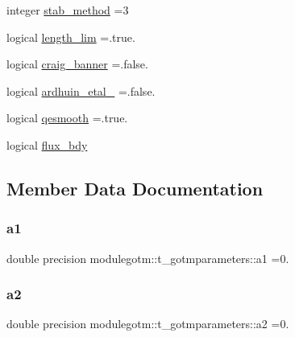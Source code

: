 \begin{DoxyCompactItemize}
integer \mbox{\hyperlink{structmodulegotm_1_1t__gotmparameters_a9f1e855319ebed889b5955d76280eeed}{stab\+\_\+method}} =3
\item 
logical \mbox{\hyperlink{structmodulegotm_1_1t__gotmparameters_a0593cb753559f5ac00d31b5189fb85f3}{length\+\_\+lim}} =.true.
\item 
logical \mbox{\hyperlink{structmodulegotm_1_1t__gotmparameters_afc2bb81fbc814f94435863864b9c371d}{craig\+\_\+banner}} =.false.
\item 
logical \mbox{\hyperlink{structmodulegotm_1_1t__gotmparameters_ab1f774e22e5d05e2cb2b8c87b3db891e}{ardhuin\+\_\+etal\+\_}} =.false.
\item 
logical \mbox{\hyperlink{structmodulegotm_1_1t__gotmparameters_a33151710fad92ac09284c0b216401bf4}{qesmooth}} =.true.
\item 
logical \mbox{\hyperlink{structmodulegotm_1_1t__gotmparameters_ad0ead3170056faa1cd383ab5336fc9ac}{flux\+\_\+bdy}}
\end{DoxyCompactItemize}


\subsection{Member Data Documentation}
\mbox{\label{structmodulegotm_1_1t__gotmparameters_a6869ca7477599a18cf432297ee04d5c6}} 
\subsubsection{\texorpdfstring{a1}{a1}}
{\footnotesize\ttfamily double precision modulegotm\+::t\+\_\+gotmparameters\+::a1 =0.\hspace{0.3cm}{\ttfamily [private]}}

\mbox{\label{structmodulegotm_1_1t__gotmparameters_a3c59fd981ba42a5e030a4525dded44f7}} 
\subsubsection{\texorpdfstring{a2}{a2}}
{\footnotesize\ttfamily double precision modulegotm\+::t\+\_\+gotmparameters\+::a2 =0.\hspace{0.3cm}{\ttfamily [private]}}

